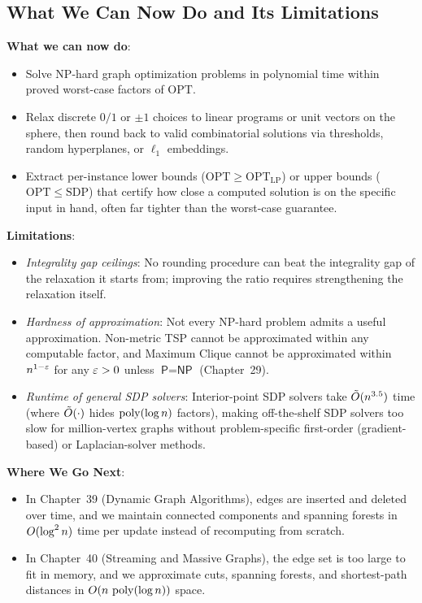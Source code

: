 \subsection{What We Can Now Do and Its Limitations}
\begin{connectionbox}
\textbf{What we can now do}:
\begin{itemize}
  \item Solve \textsf{NP}-hard graph optimization problems in polynomial time within proved worst-case factors of $\mathrm{OPT}$.
  \item Relax discrete $0/1$ or $\pm 1$ choices to linear programs or unit vectors on the sphere, then round back to valid combinatorial solutions via thresholds, random hyperplanes, or $\ell_1$ embeddings.
  \item Extract per-instance lower bounds ($\mathrm{OPT} \ge \mathrm{OPT}_{\mathrm{LP}}$) or upper bounds ($\mathrm{OPT} \le \mathrm{SDP}$) that certify how close a computed solution is on the specific input in hand, often far tighter than the worst-case guarantee.
\end{itemize}

\textbf{Limitations}:
\begin{itemize}
  \item \emph{Integrality gap ceilings}: No rounding procedure can beat the integrality gap of the relaxation it starts from; improving the ratio requires strengthening the relaxation itself.
  \item \emph{Hardness of approximation}: Not every \textsf{NP}-hard problem admits a useful approximation. Non-metric TSP cannot be approximated within any computable factor, and Maximum Clique cannot be approximated within $n^{1-\varepsilon}$ for any $\varepsilon > 0$ unless $\textsf{P} = \textsf{NP}$ (Chapter~29).
  \item \emph{Runtime of general SDP solvers}: Interior-point SDP solvers take $\tilde{O}(n^{3.5})$ time (where $\tilde{O}(\cdot)$ hides $\operatorname{poly}(\log n)$ factors), making off-the-shelf SDP solvers too slow for million-vertex graphs without problem-specific first-order (gradient-based) or Laplacian-solver methods.
\end{itemize}

\textbf{Where We Go Next}:
\begin{itemize}
  \item In Chapter~39 (Dynamic Graph Algorithms), edges are inserted and deleted over time, and we maintain connected components and spanning forests in $O(\log^2 n)$ time per update instead of recomputing from scratch.
  \item In Chapter~40 (Streaming and Massive Graphs), the edge set is too large to fit in memory, and we approximate cuts, spanning forests, and shortest-path distances in $O(n\,\operatorname{poly}(\log n))$ space.
\end{itemize}
\end{connectionbox}

